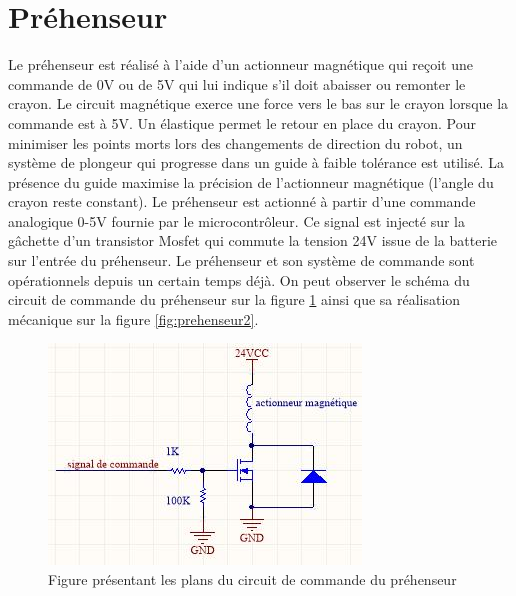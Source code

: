 \section{Préhenseur}
Le préhenseur est réalisé à l’aide d’un actionneur magnétique qui reçoit une commande de 0V ou de 5V qui lui indique s’il doit abaisser ou remonter le crayon. Le circuit magnétique exerce une force vers le bas sur le crayon lorsque la commande est à 5V. Un élastique permet le retour en place du crayon. Pour minimiser les points morts lors des changements de direction du robot, un système de plongeur qui progresse dans un guide à faible tolérance est utilisé. La présence du guide maximise la précision de l’actionneur magnétique (l'angle du crayon reste constant). Le préhenseur est actionné à partir d'une commande analogique 0-5V fournie par le microcontrôleur. Ce signal est injecté sur la gâchette d’un transistor Mosfet qui commute la tension 24V issue de la batterie sur l'entrée du préhenseur. Le préhenseur et son système de commande sont opérationnels depuis un certain temps déjà. On peut observer le schéma du circuit de commande du préhenseur sur la figure \ref{fig:prehenseur} ainsi que sa réalisation mécanique sur la figure \ref{fig:prehenseur2}.

\begin{figure}[htbp]
\centering
\includegraphics[scale=0.5]{fig/prehenseur.jpg}
\caption{Figure présentant les plans du circuit de commande du préhenseur}
\label{fig:prehenseur}
\end{figure}


